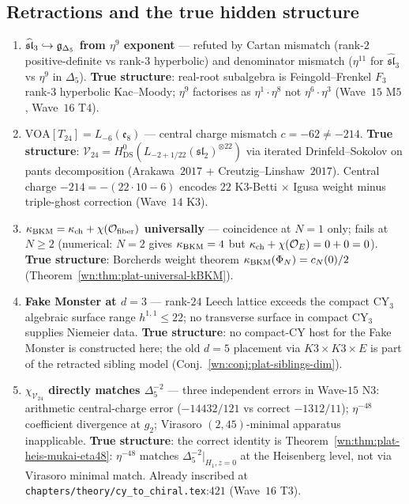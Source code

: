 \subsection{Retractions and the true hidden structure}
\label{wn:subsec:plat-retractions}

\begin{theorem}
\label{wn:thm:plat-retractions}
\begin{enumerate}
\item \textbf{$\widehat{\mathfrak{sl}}_3 \hookrightarrow \mathfrak{g}_{\Delta_5}$
from $\eta^9$ exponent} \ClaimStatusRetracted --- refuted by Cartan
mismatch (rank-$2$ positive-definite vs rank-$3$ hyperbolic) and
denominator mismatch ($\eta^{11}$ for $\widehat{\mathfrak{sl}}_3$ vs
$\eta^9$ in $\Delta_5$). \textbf{True structure}: real-root subalgebra is
Feingold--Frenkel $F_3$ rank-$3$ hyperbolic Kac--Moody; $\eta^9$
factorises as $\eta^1 \cdot \eta^8$ not $\eta^6 \cdot \eta^3$
(Wave~$15$ M$5$, Wave~$16$ T$4$).

\item \textbf{$\mathrm{VOA}[T_{24}] = L_{-6}(\mathfrak{e}_8)$}
\ClaimStatusRetracted --- central charge mismatch $c = -62 \neq -214$.
\textbf{True structure}: $\mathcal{V}_{24} =
H^0_{\mathrm{DS}}(L_{-2 + 1/22}(\mathfrak{sl}_2)^{\otimes 22})$ via iterated
Drinfeld--Sokolov on pants decomposition (Arakawa~$2017$ +
Creutzig--Linshaw~$2017$). Central charge $-214 = -(22 \cdot 10 - 6)$
encodes $22$ K3-Betti $\times$ Igusa weight minus triple-ghost correction
(Wave~$14$ K$3$).

\item \textbf{$\kappa_{\mathrm{BKM}} = \kappa_{\mathrm{ch}} + \chi(\mathcal{O}_{\mathrm{fiber}})$ universally}
\ClaimStatusRetracted --- coincidence at $N = 1$ only; fails at $N \geq 2$
(numerical: $N=2$ gives $\kappa_{\mathrm{BKM}} = 4$ but $\kappa_{\mathrm{ch}} + \chi(\mathcal{O}_E) = 0 + 0 = 0$).
\textbf{True structure}: Borcherds weight theorem $\kappa_{\mathrm{BKM}}(\Phi_N) = c_N(0)/2$
(Theorem~\ref{wn:thm:plat-universal-kBKM}).

\item \textbf{Fake Monster at $d = 3$} \ClaimStatusRetracted --- rank-$24$
Leech lattice exceeds the compact CY$_3$ algebraic surface range
$h^{1,1}\leq 22$; no transverse surface in compact CY$_3$ supplies
Niemeier data. \textbf{True structure}: no compact-CY host for the Fake
Monster is constructed here; the old $d=5$ placement via
$K3 \times K3 \times E$ is part of the retracted sibling model
(Conj.~\ref{wn:conj:plat-siblings-dim}).

\item \textbf{$\chi_{\mathcal{V}_{24}}$ directly matches $\Delta_5^{-2}$}
\ClaimStatusRetracted --- three independent errors in Wave-$15$ N$3$:
arithmetic central-charge error ($-14432/121$ vs correct $-1312/11$);
$\eta^{-48}$ coefficient divergence at $g_2$; Virasoro $(2, 45)$-minimal
apparatus inapplicable. \textbf{True structure}: the correct identity is
Theorem~\ref{wn:thm:plat-heis-mukai-eta48}: $\eta^{-48}$ matches
$\Delta_5^{-2}|_{H_1, z=0}$ at the Heisenberg level, not via Virasoro
minimal match. Already inscribed at
\texttt{chapters/theory/cy\_to\_chiral.tex}:$421$ (Wave~$16$ T$3$).


\end{enumerate}
\end{theorem}
